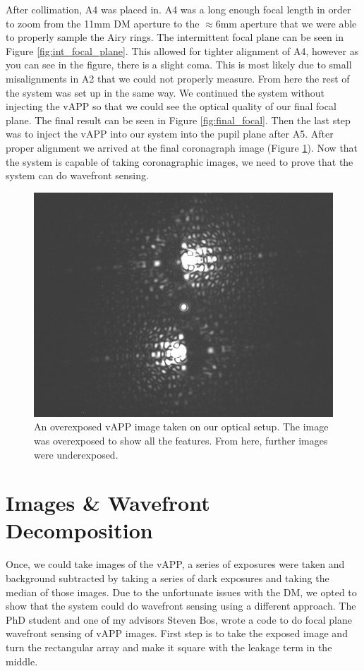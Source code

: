 After collimation, A4 was placed in.  A4 was a long enough focal length in order to zoom from the 11mm DM aperture to the $\approx 6$mm aperture that we were able to properly sample the Airy rings.  The intermittent focal plane can be seen in Figure \ref{fig:int_focal_plane}.  This allowed for tighter alignment of A4, however as you can see in the figure, there is a slight coma.  This is most likely due to small misalignments in A2 that we could not properly measure.  From here the rest of the system was set up in the same way.  We continued the system without injecting the vAPP so that we could see the optical quality of our final focal plane.  The final result can be seen in Figure \ref{fig:final_focal}.  Then the last step was to inject the vAPP into our system into the pupil plane after A5.  After proper alignment we arrived at the final coronagraph image (Figure \ref{fig:GMT_vapp}). Now that the system is capable of taking coronagraphic images, we need to prove that the system can do wavefront sensing.

\begin{figure}[H]
    \centering
    \includegraphics[width = 14cm]{Figures/GMT_gvAPP_04_03_2020.jpg}
    \caption{An overexposed vAPP image taken on our optical setup.  The image was overexposed to show all the features.  From here, further images were underexposed.}
    \label{fig:GMT_vapp}
\end{figure}




\section{Images \& Wavefront Decomposition}

Once, we could take images of the vAPP, a series of exposures were taken and background subtracted by taking a series of dark exposures and taking the median of those images.  Due to the unfortunate issues with the DM, we opted to show that the system could do wavefront sensing using a different approach.  The PhD student and one of my advisors Steven Bos, wrote a code to do focal plane wavefront sensing of vAPP images.  First step is to take the exposed image and turn the rectangular array and make it square with the leakage term in the middle.
